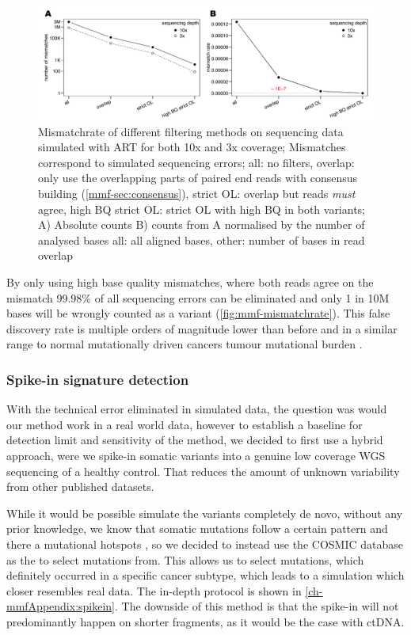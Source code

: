 \begin{figure}[!ht]
\centering
\includegraphics[width=.99\linewidth]{Figures/mismatchrateCleanSequencing.pdf}
\caption[Mismatchrate of different filtering methods]{Mismatchrate of different filtering methods on sequencing data simulated with ART\cite{Huang2011} for both 10x and 3x coverage; Mismatches correspond to simulated sequencing errors; all: no filters, overlap: only use the overlapping parts of paired end reads with consensus building (\protect\autoref{mmf-sec:consensus}), strict OL: overlap but reads \emph{must} agree, high BQ strict OL: strict OL with high BQ in both variants; A) Absolute counts B) counts from A normalised by the number of analysed bases all: all aligned bases, other: number of bases in read overlap}\label{fig:mmf-mismatchrate}
\end{figure}

By only using high base quality mismatches, where both reads agree on the mismatch 99.98\% of all sequencing errors can be eliminated and only 1 in 10M bases will be wrongly counted as a variant (\autoref{fig:mmf-mismatchrate}). This false discovery rate is multiple orders of magnitude lower than before and in a similar range to normal mutationally driven cancers tumour mutational burden \cite{Alexandrov2020,Lawrence2013a}.


\subsubsection{Spike-in signature detection}
\label{mmf-sec:simSingnatures}
With the technical error eliminated in simulated data, the question was would our method work in a real world data, however to establish a baseline for detection limit and sensitivity of the method, we decided to first use a hybrid approach, were we spike-in somatic variants into a genuine low coverage WGS sequencing of a healthy control. That reduces the amount of unknown variability from other published datasets.

While it would be possible simulate the variants completely de novo, without any prior knowledge, we know that somatic mutations follow a certain pattern and there a mutational hotspots \cite{Chen2016,Moore2021}, so we decided to instead use the COSMIC database \cite{Tate2018,WSI2021} as the  to select mutations from. This allows us to select mutations, which definitely occurred in a specific cancer subtype, which leads to a simulation which closer resembles real data. The in-depth protocol is shown in \autoref{ch-mmfAppendix:spikein}. The downside of this method is that the spike-in will not predominantly happen on shorter fragments, as it would be the case with ctDNA. 

